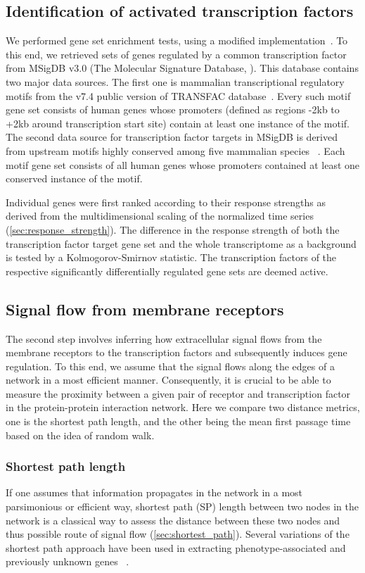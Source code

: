 \subsection{Identification of activated transcription factors}
We performed gene set enrichment tests, 
using a modified implementation~\citep{Luo2009}.
To this end, we retrieved sets of genes regulated by 
a common transcription factor from MSigDB v3.0 (The Molecular Signature Database, \cite{Liberzon2011}). 
This database contains two major data sources. The first one is mammalian 
transcriptional regulatory motifs from the v7.4 public version of TRANSFAC 
database~\citep{Matys2003b}. Every such motif gene set consists of human 
genes whose promoters (defined as regions -2kb to +2kb around transcription 
start site) contain at least one instance of the motif.
The second data source for transcription factor targets in MSigDB is derived 
from upstream motifs highly conserved among five mammalian species~%
\citep{Xie2005e}. Each motif gene set consists of all human genes whose 
promoters contained at least one conserved instance of the motif.

Individual genes were first ranked according to their response strengths as derived from the 
multidimensional scaling of the normalized time series 
(\ref{sec:response_strength}). The difference in the response strength of both
the transcription factor target gene set and  
the whole transcriptome as a background is tested by a Kolmogorov-Smirnov statistic. 
The transcription factors of the respective significantly differentially regulated
gene sets are deemed active.

\subsection{Signal flow from membrane receptors}
The second step involves inferring how extracellular signal flows from the 
membrane receptors to 
the transcription factors and subsequently induces gene regulation. 
To this end, we assume that the signal flows along the edges of a network 
in a most efficient manner. Consequently, it is 
crucial to be able to measure the proximity between a given pair of receptor and
transcription factor in the protein-protein interaction network. Here we 
compare two distance metrics, one is the shortest path length, and the other
being the mean first passage time based on the idea of random walk.

\subsubsection{Shortest path length}
If one assumes that information propagates in the network in a most parsimonious
or efficient way,
shortest path (SP) length between two nodes in the network is a classical way to
assess the distance between these two nodes and thus possible route of signal flow
(\ref{sec:shortest_path}). Several variations of the 
shortest path approach have been used in extracting 
phenotype-associated and previously unknown genes~%
\citep{Zhou2002,Managbanag2008}.

